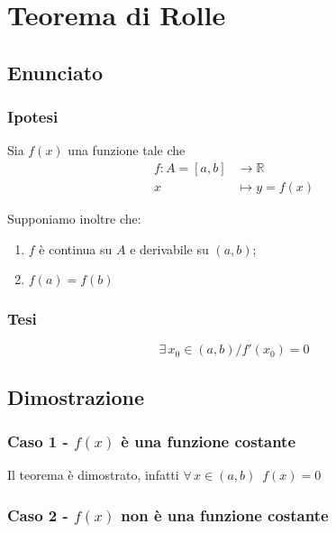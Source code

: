 \documentclass[../dimostrazioni]{subfiles}
\begin{document}
    \chapter{Teorema di Rolle}

        \section*{Enunciato}

        \subsection*{Ipotesi}

            Sia \(f(x)\) una funzione tale che
            \begin{align*}
                f : A = [a, b] &\longrightarrow \mathbb{R}\\
                x &\longmapsto y = f(x) 
            \end{align*}

            Supponiamo inoltre che:

            \begin{enumerate}
                \indentitem \item \(f\) è continua su \(A\) e derivabile su \((a, b)\);
                \indentitem \item \(f(a) = f(b)\)
            \end{enumerate}

        \subsection*{Tesi}

            \[\exists \, x_0 \in (a,b) / f'(x_0) = 0 \]

        \section*{Dimostrazione}

            \medskip

            \subsection{Caso 1 - \(f(x)\) è una funzione costante}

            Il teorema è dimostrato, infatti \(\forall \, x \in (a,b) \, \, \, f(x) = 0\)

            \subsection{Caso 2 - \(f(x)\) non è una funzione costante}
\end{document}
